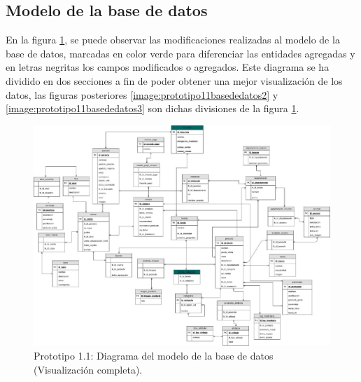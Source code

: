 
\subsection{Modelo de la base de datos}

En la figura \ref{image:prototipo11basededatos1}, se puede observar las modificaciones realizadas al modelo de la base de datos, marcadas en color verde para diferenciar las entidades agregadas y en letras negritas los campos modificados o agregados. Este diagrama se ha dividido en dos secciones a fin de poder obtener una mejor visualización de los datos, las figuras posteriores \ref{image:prototipo11basededatos2} y \ref{image:prototipo11basededatos3} son dichas divisiones de la figura \ref{image:prototipo11basededatos1}.
\label{Modelo-BD}
\FloatBarrier
\begin{figure}[htbp!]
		\centering
			\includegraphics[width=1 \textwidth]{imagenes/modeloDatos/TT_database1_1}
		\caption{Prototipo 1.1: Diagrama del modelo de la base de datos (Visualización completa).}
		\label{image:prototipo11basededatos1}
\end{figure}
\FloatBarrier

